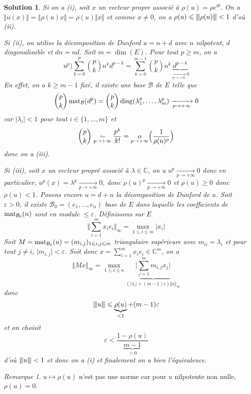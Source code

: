 \documentclass[12pt]{article}
\newtheorem{solution}{Solution}[section]
\theoremstyle{remark}
\newtheorem{remark}{Remarque}[section]
\newcommand{\C}{\mathbb{C}} \newcommand{\Q}{\mathbb{Q}}
\newcommand{\vertiii}[1]{{\left\vert\kern-0.25ex\left\vert\kern-0.25ex\left\vert{}#1
\right\vert\kern-0.25ex\right\vert\kern-0.25ex\right\vert}}
\numberwithin{equation}{section}
\begin{document}
\begin{solution}
	Si on a (i), soit $x$ un vecteur propre associé à $\rho(u)=\rho e^{\mathrm{i}\theta}$. On a $\Vert u(x)\Vert=\Vert\rho(u) x\Vert=\rho(u)\Vert x\Vert$ et comme $x\neq0$, on a $\rho(u)\leqslant\vertiii{\rho(u)}<1$ d'où (ii).

	Si (ii), on utilise la décomposition de Dunford $u=n+d$ avec $n$ nilpotent, $d$ diagonalisable et $dn=nd$. Soit $m=\dim(E)$. Pour tout $p\geqslant m$, on a 
	$$u^{p})\sum_{k=0}^{p}\binom{p}{k}n^{k}d^{p-k}=\sum_{k=0}^{m-1}\binom{p}{k}n^{k}\underbrace{d^{p-k}}_{\xrightarrow[p\to+\infty]{}0}$$
	En effet, on a $k\geqslant m-1$ fixé, il existe une base $\mathcal{B}$ de $E$ telle que 
	$$\binom{p}{k}\operatorname{mat}\limits_{\mathcal{B}}(d^{p})=\binom{p}{k}\operatorname{diag}(\lambda_{1}^{p},\dots,\lambda_{m}^{p})\xrightarrow[p\to+\infty]{}0$$
	car $\vert\lambda_{i}\vert<1$ pour tout $i\in\{1,\dots,m\}$ et 
	$$\binom{p}{k}\underset{p\to+\infty}{\sim}\frac{p^{k}}{k!}=\underset{p\to+\infty}{o}\Bigl(\frac{1}{\rho(u)^{p}}\Bigr)$$
	donc on a (iii).

	Si (iii), soit $x$ un vecteur propré associé à $\lambda\in\C$, on a $u^{p}\xrightarrow[p\to+\infty]{}0$ donc en particulier, $u^{p}(x)=\lambda^{p}\xrightarrow[p\to+\infty]{}0$, donc $\rho(u)^{p}\xrightarrow[p\to+\infty]{}0$ et $\rho(u)\geqslant0$ donc $\rho(u)<1$. Posons encore $u=d+n$ la décomposition de Dunford de $u$. Soit $\varepsilon>0$, il existe $\mathcal{B}_{0}=(e_{1},\dots,e_{n})$ base de $E$ dans laquelle les coefficients de $\operatorname{mat}\limits_{\mathcal{B}_{0}}(n)$ sont en module $\leqslant\varepsilon$. Définissons sur $E$ 
	$$\Biggl\Vert\sum_{i=1}^{m}x_{i}e_{i}\Biggr\Vert_{\infty}=\max\limits_{1\leqslant i\leqslant m}\vert x_{i}\vert$$
	Soit $M=\operatorname{mat}\limits_{\mathcal{B}_{0}}(u)=(m_{i,j})_{1\leqslant i,j\leqslant m}$ triangulaire supérieure avec $m_{ii}=\lambda_{i}$ et pour tout $j\neq i$, $\vert m_{i,j}\vert<\varepsilon$. Soit donc $x=\sum_{i=1}^{m}x_{i}e_{i}\in\C^{m}$, on a 
	$$
	\Vert Mx\Vert_{\infty}=\max\limits_{1\leqslant i\leqslant n}\underbrace{\Biggl\vert\sum_{j=1}^{m}m_{i,j}x_{j}\Biggr\vert}_{(\vert\lambda_{i}\vert+(m-1)\varepsilon)\Vert x\Vert_{\infty}}
	$$
	donc 
	$$\vertiii{u}\leqslant\underbrace{\rho(u)}_{<1}+(m-1)\varepsilon$$
	et on choisit
	$$\varepsilon<\frac{1-\rho(u)}{\underbrace{m-1}_{>0}}$$
	d'où $\vertiii{u}<1$ et donc on a (i) et finalement on a bien l'équivalence.
\end{solution}

\begin{remark}
	$u\mapsto\rho(u)$ n'est pas une norme car pour $u$ nilpotente non nulle, $\rho(u)=0$.
\end{remark}
\end{document}
